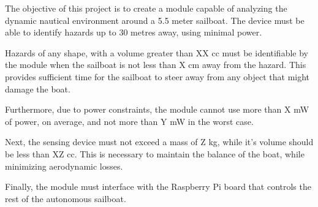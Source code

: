 The objective of this project is to create a module capable of analyzing the dynamic nautical environment around a 5.5 meter sailboat. The device must be able to identify hazards up to 30 metres away, using minimal power.

Hazards of any shape, with a volume greater than XX cc must be identifiable by the module when the sailboat is not less than X cm away from the hazard. This provides sufficient time for the sailboat to steer away from any object that might damage the boat.

Furthermore, due to power constraints, the module cannot use more than X mW of power, on average, and not more than Y mW in the worst case.

Next, the sensing device must not exceed a mass of Z kg, while it's volume should be less than XZ cc. This is necessary to maintain the balance of the boat, while minimizing aerodynamic losses.

Finally, the module must interface with the Raspberry Pi board that controls the rest of the autonomous sailboat.